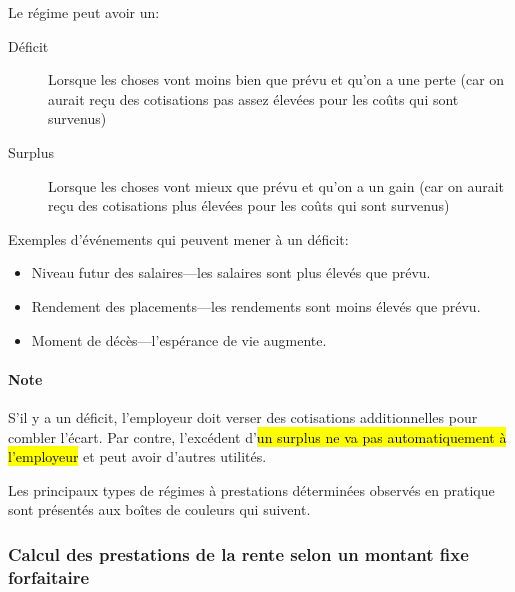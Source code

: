 \documentclass[10pt, french]{article}
\begin{document}
\begin{multicols*}{3}
\begin{definitionNOHFILLsub}
Le régime peut avoir un:
\begin{description}
	\item[Déficit]	Lorsque les choses vont moins bien que prévu et qu'on a une perte (car on aurait reçu des cotisations pas assez élevées pour les coûts qui sont survenus) 
	\item[Surplus]	Lorsque les choses vont mieux que prévu et qu'on a un gain (car on aurait reçu des cotisations plus élevées pour les coûts qui sont survenus) 
\end{description}

Exemples d'événements qui peuvent mener à un déficit:
\begin{itemize}[leftmargin = *]
	\item	Niveau futur des salaires---les salaires sont plus élevés que prévu.
	\item	Rendement des placements---les rendements sont moins élevés que prévu.
	\item	Moment de décès---l'espérance de vie augmente.
\end{itemize}


\paragraph{Note} S'il y a un déficit, l'employeur doit verser des cotisations additionnelles pour combler l'écart. Par contre, l'excédent d'\hl{un surplus ne va pas automatiquement à l'employeur} et peut avoir d'autres utilités.
\end{definitionNOHFILLsub}

Les principaux types de régimes à prestations déterminées observés en pratique sont présentés aux boîtes de couleurs qui suivent. 

\subsubsection*{Calcul des prestations de la rente selon un montant fixe forfaitaire}


\end{multicols*}
\end{document}
